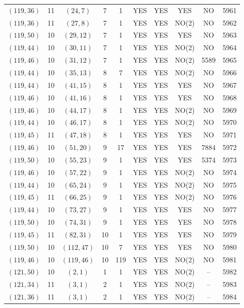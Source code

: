 \begin{longtable}{|c|c|c|c|c|c|c|c|c|c|}
$(119, 36)$ & 11 & $(24, 7)$ & 7 & 1 & YES & YES & YES & NO & 5961\\
$(119, 36)$ & 11 & $(27, 8)$ & 7 & 1 & YES & YES & NO(2) & NO & 5962\\
$(119, 50)$ & 10 & $(29, 12)$ & 7 & 1 & YES & YES & YES & NO & 5963\\
$(119, 44)$ & 10 & $(30, 11)$ & 7 & 1 & YES & YES & NO(2) & NO & 5964\\
$(119, 46)$ & 10 & $(31, 12)$ & 7 & 1 & YES & YES & NO(2) & 5589 & 5965\\
$(119, 44)$ & 10 & $(35, 13)$ & 8 & 7 & YES & YES & NO(2) & NO & 5966\\
$(119, 44)$ & 10 & $(41, 15)$ & 8 & 1 & YES & YES & YES & NO & 5967\\
$(119, 46)$ & 10 & $(41, 16)$ & 8 & 1 & YES & YES & YES & NO & 5968\\
$(119, 46)$ & 10 & $(44, 17)$ & 8 & 1 & YES & YES & NO(2) & NO & 5969\\
$(119, 44)$ & 10 & $(46, 17)$ & 8 & 1 & YES & YES & NO(2) & NO & 5970\\
$(119, 45)$ & 11 & $(47, 18)$ & 8 & 1 & YES & YES & YES & NO & 5971\\
$(119, 46)$ & 10 & $(51, 20)$ & 9 & 17 & YES & YES & YES & 7884 & 5972\\
$(119, 50)$ & 10 & $(55, 23)$ & 9 & 1 & YES & YES & YES & 5374 & 5973\\
$(119, 46)$ & 10 & $(57, 22)$ & 9 & 1 & YES & YES & NO(2) & NO & 5974\\
$(119, 44)$ & 10 & $(65, 24)$ & 9 & 1 & YES & YES & NO(2) & NO & 5975\\
$(119, 45)$ & 11 & $(66, 25)$ & 9 & 1 & YES & YES & NO(2) & NO & 5976\\
$(119, 44)$ & 10 & $(73, 27)$ & 9 & 1 & YES & YES & YES & NO & 5977\\
$(119, 50)$ & 10 & $(74, 31)$ & 9 & 1 & YES & YES & YES & NO & 5978\\
$(119, 45)$ & 11 & $(82, 31)$ & 10 & 1 & YES & YES & YES & NO & 5979\\
$(119, 50)$ & 10 & $(112, 47)$ & 10 & 7 & YES & YES & YES & NO & 5980\\
$(119, 46)$ & 10 & $(119, 46)$ & 10 & 119 & YES & YES & NO(2) & NO & 5981\\
$(121, 50)$ & 10 & $(2, 1)$ & 1 & 1 & YES & YES & NO(2) & -- & 5982\\
$(121, 34)$ & 11 & $(3, 1)$ & 2 & 1 & YES & YES & NO(2) & -- & 5983\\
$(121, 36)$ & 11 & $(3, 1)$ & 2 & 1 & YES & YES & NO(2) & -- & 5984\\

\end{longtable}
